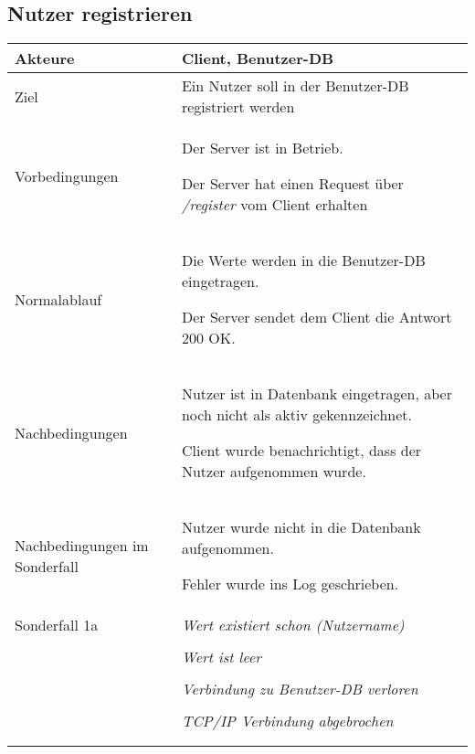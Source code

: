 \documentclass[a4paper,10pt,titlepage]{article}
\makeatletter
\newcommand\novspace{\@minipagetrue}
\newenvironment{owncompactitem}{%
\compactitem
}{%
\@finalstrut\@arstrutbox
\@nameuse{endcompactitem}%
\aftergroup\let\aftergroup\@finalstrut\aftergroup\@gobble
}
\newenvironment{owncompactenum}{%
\compactenum
}{%
\@finalstrut\@arstrutbox
\@nameuse{endcompactenum}%
\aftergroup\let\aftergroup\@finalstrut\aftergroup\@gobble
}
\newcommand{\usecase}[7]
{\subsection{#1}
\setlength{\extrarowheight}{2pt}
\begin{tabular}{|p{0.2\textwidth}|p{0.9\textwidth}|}
\hline
  Akteure & #2\\\hline
  Ziel & #3\\\hline
  Vorbedingungen & \novspace
  	\begin{owncompactitem}[-] #4 \end{owncompactitem} \\\hline
  Normalablauf & \vspace{-7pt}
  	\begin{owncompactenum}[1.] #6 \end{owncompactenum} \\\hline
  Nachbedingungen & \novspace
  	\begin{owncompactitem}[-] #5 \end{owncompactitem} \\\hline
  #7
\end{tabular}
}
\newcommand{\sonderfall}[4][\empty]
{
Sonderfall #2 & \vspace{-10pt}
	\textit{#3}
	\begin{owncompactenum}[{#2}.1] {#4} \end{owncompactenum}
  	\ifthenelse{\equal{#1}{\empty}}
    	{\\\hline} %
    	{\ensuremath{\rightarrow} #1 \\ [+1pt] \hline} %

}
\newcommand{\sondernachbedingung}[1]
{
Nachbedingungen im Sonderfall& \novspace
	\begin{owncompactitem}[-]
		#1
	\end{owncompactitem} \\\hline
}
\makeatother
\begin{document}
\usecase{Nutzer registrieren}{Client, Benutzer-DB}%
{Ein Nutzer soll in der Benutzer-DB registriert werden}%
{%
  \item Der Server ist in Betrieb.
  \item Der Server hat einen Request über \textit{/register} vom Client erhalten
}
{%
  \item Nutzer ist in Datenbank eingetragen, aber noch nicht als aktiv gekennzeichnet.
  \item Client wurde benachrichtigt, dass der Nutzer aufgenommen wurde.
}
{%
  \item  Die Werte werden in die Benutzer-DB eingetragen.
  \item  Der Server sendet dem Client die Antwort 200 OK.
}
{%
  \sondernachbedingung{
	\item Nutzer wurde nicht in die Datenbank aufgenommen.
	\item Fehler wurde ins Log geschrieben.
	}
  
  \sonderfall[Fehler]{1a}%
	  {Wert existiert schon (Nutzername)}%
	  {
	  \item Der Fehler wird ins Log geschrieben.
	  \item Dem Client wird ein entsprechender Fehler übermittelt.
	  } 

  \sonderfall[Fehler]{1b}%
	  {Wert ist leer}%
	  {
	  \item Der Fehler wird ins Log geschrieben.
	  \item Dem Client wird ein entsprechender Fehler übermittelt.
	  }

	  \sonderfall[Kritischer Fehler, Server ist beendet]{*}%
	{Verbindung zu Benutzer-DB verloren}%
  	{
	\item Der Fehler wird ins Log geschrieben (als schwerwiegender Fehler)
	\item Der Client erhält eine entsprechende Fehlermeldung
	\item Der Server wird beendet
  	}

\sonderfall[Weiter mit normalem Betrieb]{**}%
	{TCP/IP Verbindung abgebrochen}%
	{
	\item Fehlermeldung wird ins Log geschrieben
	}
}
\end{document}
